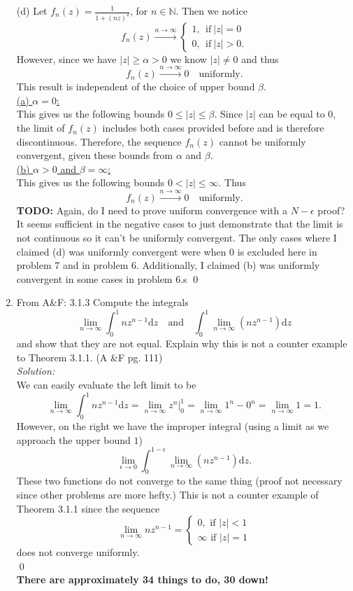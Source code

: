 \documentclass[10pt]{amsart}
\newcommand{\D}{\mathrm{d}}
\theoremstyle{nonumberplain}
\begin{document}
\begin{enumerate}[label={\bf {\arabic*}:}]
\noindent
(d) Let $f_n(z) = \frac 1 {1 + (nz)^2}$, for $n \in \mathbb N$. Then we notice
$$
f_n(z) \overset{n \to \infty}{\longrightarrow} \begin{cases}
1, \: \: \text{if}\: |z| = 0 \\
0, \: \: \text{if}\: |z| > 0.
\end{cases}
$$
However, since we have $|z| \geq \alpha > 0$ we know $|z| \neq 0$ and thus
$$
f_n(z) \overset{n \to \infty}{\longrightarrow} 0 \quad \text{uniformly}.
$$
This result is independent of the choice of upper bound $\beta$. \\

\underline{(a) $\alpha = 0$:} \\
This gives us the following bounds $0 \leq |z| \leq \beta$.
Since $|z|$ can be equal to $0$, the limit of $f_n(z)$ includes both cases provided before and is therefore discontinuous.
Therefore, the sequence $f_n(z)$ cannot be uniformly convergent, given these bounds from $\alpha$ and $\beta$. \\

\underline{(b) $\alpha > 0$ and $\beta = \infty$:} \\
This gives us the following bounds $0 < |z| \leq \infty$.
Thus
$$
f_n(z) \overset{n \to \infty}{\longrightarrow} 0 \quad \text{uniformly}.
$$
\textbf{TODO:} Again, do I need to prove uniform convergence with a $N-\epsilon$ proof?
It seems sufficient in the negative cases to just demonstrate that the limit is not continuous so it can't be uniformly convergent.
The only cases where I claimed (d) was uniformly convergent were when 0 is excluded here in problem 7 and in problem 6.
Additionally, I claimed (b) was uniformly convergent in some cases in problem 6.s
\qed \\

\newpage
\item From A\&F: 3.1.3
Compute the integrals
$$
\lim_{n \rightarrow \infty} \int_0^1 nz^{n -1}\D z \quad \text{and} \quad \int_0^1 \lim_{n \rightarrow \infty} \left(nz^{n -1} \right) \D z
$$
and show that they are not equal.
Explain why this is not a counter example to Theorem 3.1.1. (A \&F pg. 111) \\
\textit{Solution:} \\
We can easily evaluate the left limit to be
$$
\lim_{n \rightarrow \infty} \int_0^1 nz^{n -1}\D z = \lim_{n \rightarrow \infty} \left. z^n \right|_0^1 = \lim_{n \rightarrow \infty} 1^n - 0^n = \lim_{n \rightarrow \infty} 1 = 1.
$$
However, on the right we have the improper integral (using a limit as we approach the upper bound $1$)
$$
\lim_{\epsilon \rightarrow 0}\int_0^{1-\epsilon} \lim_{n \rightarrow \infty} \left(nz^{n -1} \right) \D z.
$$
These two functions do not converge to the same thing (proof not necessary since other problems are more hefty.)
This is not a counter example of Theorem 3.1.1 since the sequence
$$
\lim_{n \rightarrow \infty} nz^{n - 1} =
\begin{cases}
0, \text{ if } |z| < 1 \\
\infty \text{ if } |z| = 1
\end{cases}
$$
does not converge uniformly. \\
\qed \\

\textbf{There are approximately 34 things to do, 30 down!}
\end{enumerate}
\end{document}
